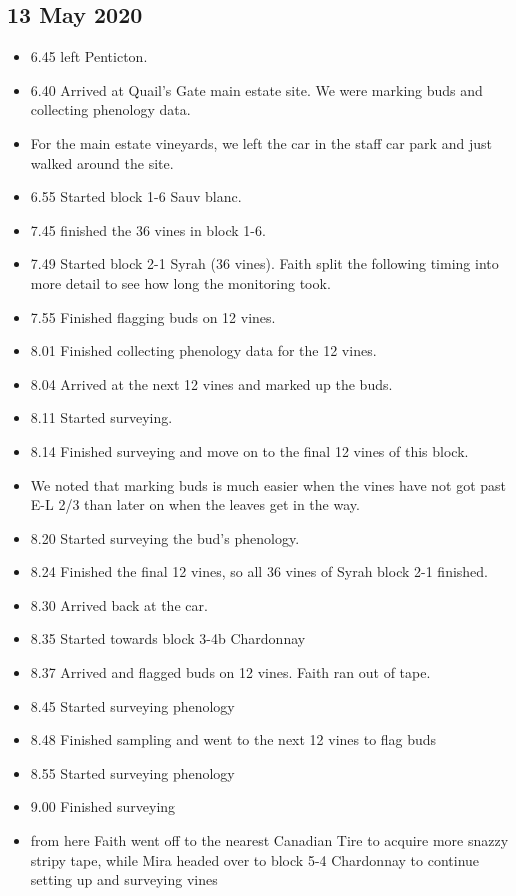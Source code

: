 \documentclass[11pt,letter]{article}
\newenvironment{smitemize}{
\begin{itemize}
  \setlength{\itemsep}{0pt}
  \setlength{\parskip}{0.8pt}
  \setlength{\parsep}{0pt}}
{\end{itemize}
}
\begin{document}
\begin{smitemize}
\end{smitemize}


\subsection {13 May 2020}
\begin{smitemize}
\item 6.45 left Penticton.
\item 6.40 Arrived at Quail's Gate main estate site. We were marking buds and collecting phenology data.
\item For the main estate vineyards, we left the car in the staff car park and just walked around the site. 
\item 6.55 Started block 1-6 Sauv blanc.
\item 7.45 finished the 36 vines in block 1-6.
\item 7.49 Started block 2-1 Syrah (36 vines). Faith split the following timing into more detail to see how long the monitoring took. 
\item 7.55 Finished flagging buds on 12 vines.
\item 8.01 Finished collecting phenology data for the 12 vines.
\item 8.04 Arrived at the next 12 vines and marked up the buds.
\item 8.11 Started surveying.
\item 8.14 Finished surveying and move on to the final 12 vines of this block.
\item We noted that marking buds is much easier when the vines have not got past E-L 2/3 than later on when the leaves get in the way. 
\item 8.20 Started surveying the bud's phenology.
\item 8.24 Finished the final 12 vines, so all 36 vines of Syrah block 2-1 finished.
\item 8.30 Arrived back at the car.  
\item 8.35 Started towards block 3-4b Chardonnay
\item 8.37 Arrived and flagged buds on 12 vines. Faith ran out of tape. 
\item 8.45 Started surveying phenology 
\item 8.48 Finished sampling and went to the next 12 vines to flag buds
\item 8.55 Started surveying phenology 
\item 9.00 Finished surveying 
\item from here Faith went off to the nearest Canadian Tire to acquire more snazzy stripy tape, while Mira headed over to block 5-4 Chardonnay to continue setting up and surveying vines

\end{smitemize}
\end{document}
